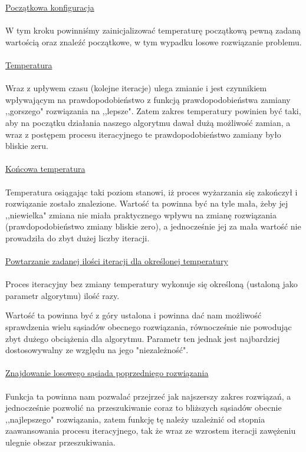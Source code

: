 \documentclass[twoside]{projektInzynierskiMS1}
\newcommand{\newLine}{~\\}
\newcommand{\si}{ś}
\begin{document}
\noindent \underline{Początkowa konfiguracja} \\ \newLine
\indent W tym kroku powinniśmy zainicjalizować temperaturę początkową pewną zadaną wartością oraz znaleźć początkowe, w tym wypadku losowe rozwiązanie problemu. 
\\ \newLine

\noindent \underline{Temperatura} \\ \newLine
\indent  Wraz z upływem czasu (kolejne iteracje) ulega zmianie i jest czynnikiem wpływającym na prawdopodobieństwo z funkcją prawdopodobieństwa zamiany ,,gorszego" rozwiązania na ,,lepsze". Zatem zakres temperatury powinien być taki, aby na początku działania naszego algorytmu dawał dużą możliwość zamian, a wraz z postępem procesu iteracyjnego te prawdopodobieństwo zamiany było bliskie zeru.\\ \newLine


\noindent \underline{Końcowa temperatura} \\ \newLine
\indent Temperatura osiągając taki poziom stanowi, iż proces wyżarzania się zakończył i rozwiązanie zostało znalezione.
Wartość ta powinna być na tyle mała, żeby jej ,,niewielka" zmiana nie miała praktycznego wpływu na zmianę rozwiązania (prawdopodobieństwo zmiany bliskie zero), a jednocze\si nie jej za mała warto\si ć nie prowadziła do zbyt dużej liczby iteracji. \\ \newLine






\noindent \underline{Powtarzanie zadanej ilo\si ci iteracji dla okre\si lonej temperatury} \\ \newLine
Proces iteracyjny bez zmiany temperatury wykonuje się okre\si loną (ustaloną jako parametr algorytmu) ilo\si ć razy.






\indent Wartość ta powinna być z góry ustalona i powinna dać nam możliwość sprawdzenia wielu sąsiadów obecnego rozwiązania, równocześnie nie powodując zbyt dużego obciążenia dla algorytmu. Parametr ten jednak jest najbardziej dostosowywalny ze względu na jego "niezależno\si ć". \\ \newLine






\noindent \underline{Znajdowanie losowego sąsiada poprzedniego rozwiązania} \\ \newLine
\indent Funkcja ta powinna nam pozwalać przejrzeć jak najszerszy zakres rozwiązań, a jednocze\si nie pozwolić na przeszukiwanie coraz to bliższych sąsiadów obecnie ,,najlepszego" rozwiązania, zatem funkcję tę należy uzależnić od stopnia zaawansowania procesu iteracyjnego, tak że wraz ze wzrostem iteracji zawężeniu ulegnie obszar przeszukiwania.\\ \newLine
\end{document}
